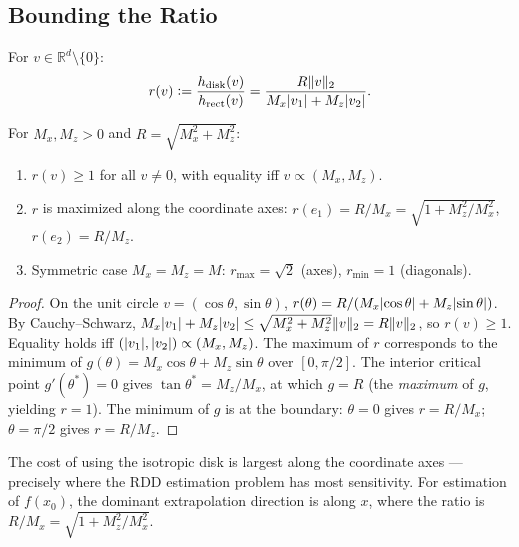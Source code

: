 \subsection{Bounding the Ratio}\label{sec:technical:ratio}

\begin{definition}\label{def:sfr}
	For $v \in \mathbb{R}^d \setminus \{0\}$:
	\begin{equation*}
		r(v) \vcentcolon= \frac{h_{\mathrm{disk}}(v)}{h_{\mathrm{rect}}(v)} = \frac{R \lVert v\rVert_2}{M_x \lvert v_1\rvert + M_z \lvert v_2\rvert}.
	\end{equation*}
\end{definition}

\begin{lemma}\label{lem:ratio_range}
	For $M_x, M_z > 0$ and $R = \sqrt{M_x^2 + M_z^2}$:
	\begin{enumerate}
		\item $r(v) \geq 1$ for all $v \neq 0$, with equality iff $v \propto (M_x, M_z)$.
		\item $r$ is maximized along the coordinate axes:
		$r(e_1) = R/M_x = \sqrt{1 + M_z^2/M_x^2}$, $r(e_2) = R/M_z$.
		\item Symmetric case $M_x = M_z = M$: $r_{\max} = \sqrt{2}$ (axes), $r_{\min} = 1$ (diagonals).
	\end{enumerate}
\end{lemma}

\begin{proof}
	On the unit circle $v = (\cos\theta, \sin\theta)$, $r(\theta) = R / (M_x\lvert\cos\theta\rvert + M_z\lvert\sin\theta\rvert)$.
	By Cauchy--Schwarz, $M_x\lvert v_1\rvert + M_z\lvert v_2\rvert \leq \sqrt{M_x^2 + M_z^2}\lVert v\rVert_2 = R\lVert v\rVert_2$, so $r(v) \geq 1$.
	Equality holds iff $(\lvert v_1\rvert, \lvert v_2\rvert) \propto (M_x, M_z)$.
	The maximum of $r$ corresponds to the minimum of $g(\theta) = M_x\cos\theta + M_z\sin\theta$ over $[0, \pi/2]$.
	The interior critical point $g'(\theta^*) = 0$ gives $\tan\theta^* = M_z/M_x$, at which $g = R$ (the \emph{maximum} of $g$, yielding $r = 1$).
	The minimum of $g$ is at the boundary: $\theta = 0$ gives $r = R/M_x$; $\theta = \pi/2$ gives $r = R/M_z$.
\end{proof}

\begin{remark}
	The cost of using the isotropic disk is largest along the coordinate axes --- precisely where the RDD estimation problem has most sensitivity.
	For estimation of $f(x_0)$, the dominant extrapolation direction is along $x$, where the ratio is $R/M_x = \sqrt{1 + M_z^2/M_x^2}$.
\end{remark}


